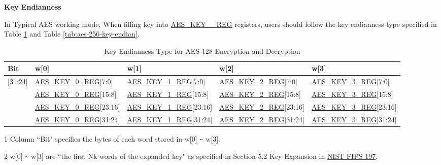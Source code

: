 \documentclass[main\_\_EN.tex]{subfiles}
\begin{document}
\textbf{Key Endianness}

In Typical AES working mode,
When filling key into \hyperref[regdesc:AESKEYnREG]{AES\_KEY\_\_REG} registers, users should follow the key endianness type specified in Table \ref{tab:aes-128-key-endian} and Table \ref{tab:aes-256-key-endian}.


\begin{table}[H]
    \centering
    \caption{Key Endianness Type for AES-128 Encryption and Decryption}
    \label{tab:aes-128-key-endian}

    \begin{threeparttable}
    \begin{tabular}{ |l|l|l|l|l| }
    \hline
        \rowcolor{lightgray}
        Bit\tnote{1} &   w[0]    &   w[1]    &   w[2]    &   w[3]\tnote{2}     \\\hline

        [31:24]     &   \hyperref[regdesc:AESKEYnREG]{AES\_KEY\_0\_REG}[7:0]    &   \hyperref[regdesc:AESKEYnREG]{AES\_KEY\_1\_REG}[7:0]    &   \hyperref[regdesc:AESKEYnREG]{AES\_KEY\_2\_REG}[7:0]    &   \hyperref[regdesc:AESKEYnREG]{AES\_KEY\_3\_REG}[7:0]\\ \hline
        [23:16]     &   \hyperref[regdesc:AESKEYnREG]{AES\_KEY\_0\_REG}[15:8]   &   \hyperref[regdesc:AESKEYnREG]{AES\_KEY\_1\_REG}[15:8]   &   \hyperref[regdesc:AESKEYnREG]{AES\_KEY\_2\_REG}[15:8]   &   \hyperref[regdesc:AESKEYnREG]{AES\_KEY\_3\_REG}[15:8]\\ \hline
        [15:8]  &   \hyperref[regdesc:AESKEYnREG]{AES\_KEY\_0\_REG}[23:16]  &   \hyperref[regdesc:AESKEYnREG]{AES\_KEY\_1\_REG}[23:16]  &   \hyperref[regdesc:AESKEYnREG]{AES\_KEY\_2\_REG}[23:16]  &   \hyperref[regdesc:AESKEYnREG]{AES\_KEY\_3\_REG}[23:16]\\ \hline
        [7:0]   &   \hyperref[regdesc:AESKEYnREG]{AES\_KEY\_0\_REG}[31:24]  &   \hyperref[regdesc:AESKEYnREG]{AES\_KEY\_1\_REG}[31:24]  & \hyperref[regdesc:AESKEYnREG]{AES\_KEY\_2\_REG}[31:24]    &   \hyperref[regdesc:AESKEYnREG]{AES\_KEY\_3\_REG}[31:24]\\ \hline
        \end{tabular}

        \begin{tablenotes}
            \item[1] Column ``Bit" specifies the bytes of each word stored in w[0] \verb+~+ w[3].
            \item[2] w[0] \verb+~+ w[3] are ``the first Nk words of the expanded key" as specified in Section 5.2 Key Expansion in \href{https://nvlpubs.nist.gov/nistpubs/FIPS/NIST.FIPS.197.pdf}{NIST FIPS 197}.
        \end{tablenotes}
     \end{threeparttable}
\end{table}
\end{document}
